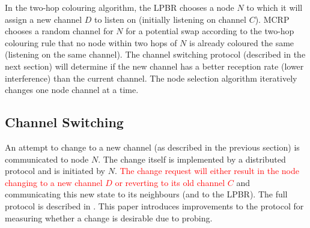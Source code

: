 In the two-hop colouring algorithm, the LPBR chooses a node $N$ to which it will assign a new channel $D$ to listen on (initially listening on channel $C$).  MCRP chooses a random channel for $N$ for a potential swap according to the two-hop colouring rule that no node within two hops of $N$ is already coloured the same (listening on the same channel).  The channel switching protocol (described in the next section) will determine if the new channel has a better reception rate (lower interference) than the current channel.  The node selection algorithm iteratively changes one node channel at a time. 


\subsection{Channel Switching}
\label{sec:switching}

An attempt to change to a new channel (as described in the previous section) is communicated to node $N$.  The change itself is implemented by a distributed protocol and is initiated by $N$. \textcolor{red}{The change request will either result in the node changing to a new channel $D$ or reverting to its old channel $C$} and communicating this new state to its neighbours (and to the LPBR).  The full protocol is described in \cite{mcrp}. This paper introduces improvements to the protocol for measuring whether a change is desirable due to probing.



